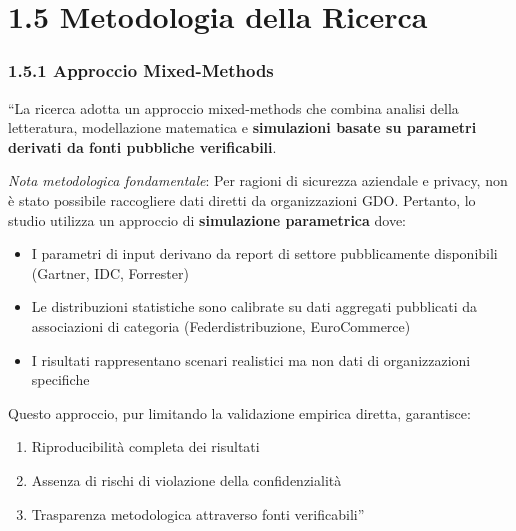 \documentclass{report}
\providecommand{\tightlist}{%
  \setlength{\itemsep}{0pt}\setlength{\parskip}{0pt}
}
\begin{document}
\section{\texorpdfstring{\textbf{1.5 Metodologia della
Ricerca}}{1.5 Metodologia della Ricerca}}\label{metodologia-della-ricerca}

\subsubsection{\texorpdfstring{\textbf{1.5.1 Approccio
Mixed-Methods}}{1.5.1 Approccio Mixed-Methods}}\label{approccio-mixed-methods}

``La ricerca adotta un approccio mixed-methods che combina analisi della
letteratura, modellazione matematica e \textbf{simulazioni basate su
parametri derivati da fonti pubbliche verificabili}.

\emph{Nota metodologica fondamentale}: Per ragioni di sicurezza
aziendale e privacy, non è stato possibile raccogliere dati diretti da
organizzazioni GDO. Pertanto, lo studio utilizza un approccio di
\textbf{simulazione parametrica} dove:

\begin{itemize}
\tightlist
\item
  I parametri di input derivano da report di settore pubblicamente
  disponibili (Gartner, IDC, Forrester)\\
\item
  Le distribuzioni statistiche sono calibrate su dati aggregati
  pubblicati da associazioni di categoria (Federdistribuzione,
  EuroCommerce)\\
\item
  I risultati rappresentano scenari realistici ma non dati di
  organizzazioni specifiche
\end{itemize}

Questo approccio, pur limitando la validazione empirica diretta,
garantisce:

\begin{enumerate}
\def\labelenumi{\arabic{enumi}.}
\tightlist
\item
  Riproducibilità completa dei risultati\\
\item
  Assenza di rischi di violazione della confidenzialità\\
\item
  Trasparenza metodologica attraverso fonti verificabili''
\end{enumerate}
\end{document}
